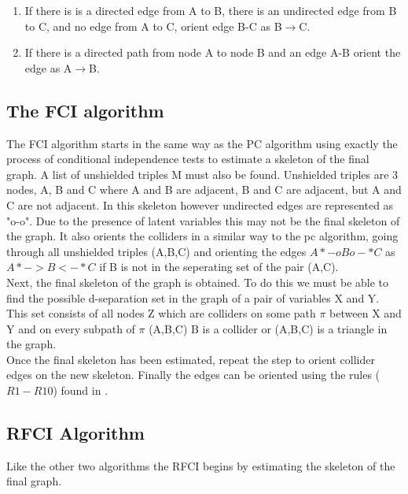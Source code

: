 \documentclass{article}
\begin{document}
\begin{enumerate}[i]
  \item If there is is a directed edge from A to B, there is an undirected edge from B to C, and no edge from A to C, orient edge B-C as B$\rightarrow$C.
  \item If there is a directed path from node A to node B and an edge A-B orient the edge as A$\rightarrow$B\cite{spirtes1991algorithm}. 
\end{enumerate}


\subsection{The FCI algorithm}

The FCI algorithm starts in the same way as the PC algorithm using exactly the process of conditional independence tests to estimate a skeleton of the final graph. A list of unshielded triples M must also be found. Unshielded triples are 3 nodes, A, B and C where A and B are adjacent, B and C are adjacent, but A and C are not adjacent. In this skeleton however undirected edges are represented as "o-o". Due to the presence of latent variables this may not be the final skeleton of the graph. It also orients the colliders in a similar way to the pc algorithm, going through all unshielded triples (A,B,C) and orienting the edges $A*-oBo-*C$ as $A*->B<-*C$ if B is not in the seperating set of the pair (A,C).
\\

Next, the final skeleton of the graph is obtained. To do this we must be able to find the possible d-separation set in the graph of a pair of variables X and Y. This set consists of all nodes Z which are colliders on some path $\pi$ between X and Y and on every subpath of $\pi$ (A,B,C) B is a collider or (A,B,C) is a triangle in the graph.
\\

Once the final skeleton has been estimated, repeat the step to orient collider edges on the new skeleton. Finally the edges can be oriented using the rules ($R1-R10$) found in \cite{ZHANG20081873}.\cite{colombo2012learning}
\\


\subsection{RFCI Algorithm}
Like the other two algorithms the RFCI begins by estimating the skeleton of the final graph.
\\
\end{document}
